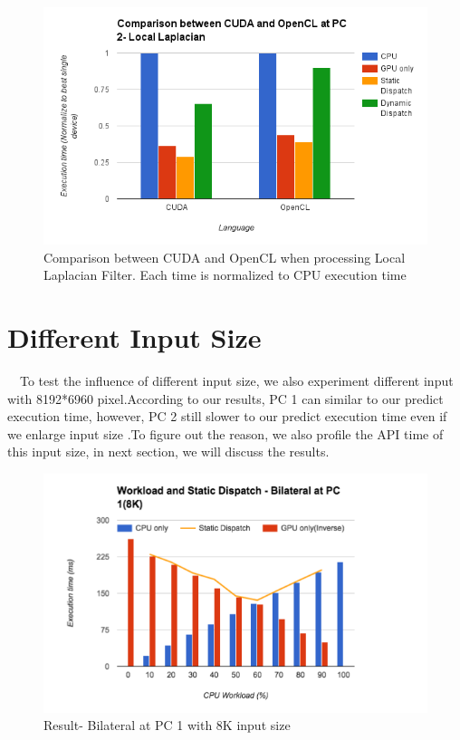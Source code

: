 \begin{figure}[hbtp]
\centering
\includegraphics[width=12cm]{img/ComparisonBetweenCUDAAndOpenCL(LocalLaplacian).png}
\caption{Comparison between CUDA and OpenCL when processing Local Laplacian Filter. Each time is normalized to CPU execution time}
\label{fig:my_label}
\end{figure}

\section{Different Input Size}
\quad \  \ To test the influence of different input size, we also experiment different input with 8192*6960 pixel.According to our results, PC 1 can similar to our predict execution time, however, PC 2 still slower to our predict execution time even if we enlarge input size .To figure out the reason, we also profile the API time of this input size, in next section, we will discuss the results.

\begin{figure}[!hbtp]
\centering
\includegraphics[width=12cm]{img/WorkloadAndStaiticDispatch-BilateralAtPC1(8K).png}
\caption{Result- Bilateral at PC 1 with 8K input size}
\label{fig:my_label}
\end{figure}

